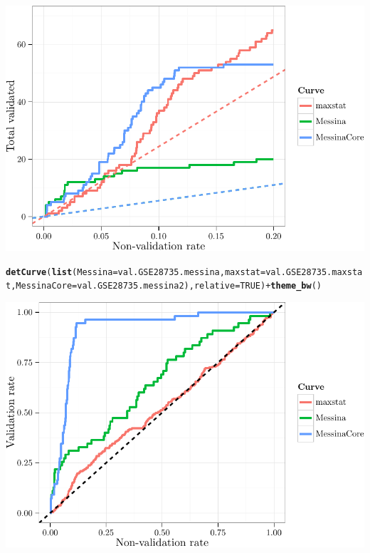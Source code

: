 \documentclass{article}\usepackage[]{graphicx}\usepackage[]{color}
\makeatletter
\def\maxwidth{ %
  \ifdim\Gin@nat@width>\linewidth
    \linewidth
  \else
    \Gin@nat@width
  \fi
}
\newcommand{\hlnum}[1]{\textcolor[rgb]{0.686,0.059,0.569}{#1}}%
\newcommand{\hlopt}[1]{\textcolor[rgb]{0,0,0}{#1}}%
\newcommand{\hlstd}[1]{\textcolor[rgb]{0.345,0.345,0.345}{#1}}%
\newcommand{\hlkwc}[1]{\textcolor[rgb]{0.333,0.667,0.333}{#1}}%
\newcommand{\hlkwd}[1]{\textcolor[rgb]{0.737,0.353,0.396}{\textbf{#1}}}%
\newenvironment{kframe}{%
 \def\at@end@of@kframe{}%
 \ifinner\ifhmode%
  \def\at@end@of@kframe{\end{minipage}}%
  \begin{minipage}{\columnwidth}%
 \fi\fi%
 \def\FrameCommand##1{\hskip\@totalleftmargin \hskip-\fboxsep
 \colorbox{shadecolor}{##1}\hskip-\fboxsep
     \hskip-\linewidth \hskip-\@totalleftmargin \hskip\columnwidth}%
 \MakeFramed {\advance\hsize-\width
   \@totalleftmargin\z@ \linewidth\hsize
   \@setminipage}}%
 {\par\unskip\endMakeFramed%
 \at@end@of@kframe}
\newenvironment{knitrout}{}{} %
\makeatother
\begin{document}
\begin{knitrout}
\begin{kframe}
{\ttfamily\noindent\color{warningcolor}{\#\# Warning: Removed 6892 rows containing missing values (geom\_path).}}\end{kframe}

{\centering \includegraphics[width=\maxwidth]{figure/07-E3-E3-val-detcurves-1} 

}


\begin{kframe}\begin{alltt}
\hlkwd{detCurve}\hlstd{(}\hlkwd{list}\hlstd{(}\hlkwc{Messina} \hlstd{= val.GSE28735.messina,} \hlkwc{maxstat} \hlstd{= val.GSE28735.maxstat,} \hlkwc{MessinaCore} \hlstd{= val.GSE28735.messina2),} \hlkwc{relative} \hlstd{=} \hlnum{TRUE}\hlstd{)} \hlopt{+} \hlkwd{theme_bw}\hlstd{()}
\end{alltt}
\end{kframe}

{\centering \includegraphics[width=\maxwidth]{figure/07-E3-E3-val-detcurves-2} 

}
\end{knitrout}
\end{document}
